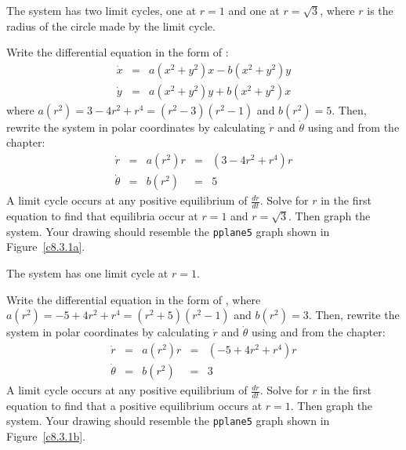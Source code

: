 \documentclass{ximera}
\begin{document}
\ans The system has two limit cycles, one at $r = 1$ and one at $r =
\sqrt{3}$, where $r$ is the radius of the circle made by the limit cycle.

\soln Write the differential equation in the form of :
\[ \begin{array}{rcl}
\dot{x} & = & a(x^2 + y^2)x - b(x^2 + y^2)y \\
\dot{y} & = & a(x^2 + y^2)y + b(x^2 + y^2)x \end{array}
\]
where $a(r^2) = 3 - 4r^2 + r^4=(r^2-3)(r^2-1)$ and $b(r^2) = 5$.  Then,
rewrite the system in polar coordinates by calculating $\dot{r}$ and
$\dot{\theta}$ using  and  from the
chapter:
\[ \begin{array}{rcccl}
\dot{r} & = & a(r^2)r & = & (3 - 4r^2 + r^4)r \\
\dot{\theta} & = & b(r^2) & = & 5 \end{array}
\]
A limit cycle occurs at any positive equilibrium of $\frac{dr}{dt}$.
Solve for $r$ in the first equation to find that equilibria occur
at $r = 1$ and $r = \sqrt{3}$.  Then graph the system.  Your drawing
should resemble the {\tt pplane5} graph shown in Figure~\ref{c8.3.1a}.

\begin{figure}[htb]
                       \centerline{%
                       }
\end{figure}


\ans The system has one limit cycle at $r = 1$.

\soln Write the differential equation in the form of ,
where $a(r^2) = -5 + 4r^2 + r^4=(r^2+5)(r^2-1)$ and $b(r^2) = 3$.  Then,
rewrite the system in polar coordinates by calculating $\dot{r}$ and
$\dot{\theta}$ using  and  from the
chapter:
\[ 
\begin{array}{rcccl}
\dot{r} & = & a(r^2)r & = & (-5 + 4r^2 + r^4)r \\
\dot{\theta} & = & b(r^2) & = & 3 \end{array}
\]
A limit cycle occurs at any positive equilibrium of $\frac{dr}{dt}$.
Solve for $r$ in the first equation to find that a positive equilibrium 
occurs at $r = 1$.  Then graph the system.  Your drawing should resemble the 
{\tt pplane5} graph shown in Figure~\ref{c8.3.1b}.

\begin{figure}[htb]
                       \centerline{%
                       }
\end{figure}
\end{document}
